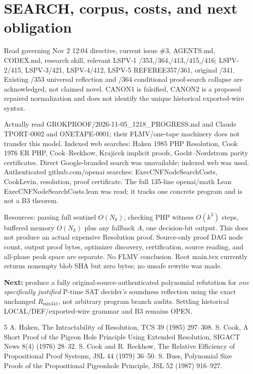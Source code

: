 \documentclass[11pt]{article}
\begin{document}
\section*{SEARCH, corpus, costs, and next obligation}
Read governing Nov 2 12:04 directive, current issue \#3, AGENTS.md, CODEX.md, research skill, relevant LSPV-1 /353,/364,/413,/415,/416; LSPV-2/415, LSPV-3/421, LSPV-4/412, LSPV-5 REFEREE357/361, original /341. Existing /353 universal reflection and /364 conditional proof-search collapse are acknowledged, not claimed novel. CANON1 is falsified, CANON2 is a proposed repaired normalization and does not identify the unique historical exported-wire syntax.

Actually read GROKPROOF/2026-11-05\_1218\_PROGRESS.md and Claude TPORT-0002 and ONETAPE-0001; their FLMV/one-tape machinery does not transfer this model. Indexed web searches: Haken 1985 PHP Resolution, Cook 1976 ER PHP, Cook--Reckhow, Krajicek implicit proofs, Gocht--Nordstrom parity certificates. Direct Google-branded search was unavailable; indexed web was used. Authenticated github.com/openai searches: ExecCNFNodeSearchCosts, CookLevin, resolution, proof certificate. The full 135-line openai/math Lean ExecCNFNodeSearchCosts.lean was read; it tracks one concrete program and is not a B3 theorem.

Resources: parsing full sentinel \(O(N_k)\), checking PHP witness \(O(k^3)\) steps, buffered memory \(O(N_k)\) plus any fallback \(A\), one decision-bit output. This does not produce an actual expensive Resolution proof. Source-only proof DAG node count, output proof bytes, optimizer discovery, certification, source reading, and all-phase peak space are separate. No FLMV conclusion. Root main.tex currently returns nonempty blob SHA but zero bytes; no unsafe rewrite was made.

\textbf{Next:} produce a fully original-source-authenticated polynomial refutation for \emph{one specifically justified} P-time SAT decider's soundness reflection using the exact unchanged \(R_{\mathrm{mix341}}\), not arbitrary program branch audits. Settling historical LOCAL/DEF/exported-wire grammar and B3 remains OPEN.
\begin{thebibliography}{5}
 A. Haken, The Intractability of Resolution, TCS 39 (1985) 297--308.
 S. Cook, A Short Proof of the Pigeon Hole Principle Using Extended Resolution, SIGACT News 8(4) (1976) 28--32.
 S. Cook and R. Reckhow, The Relative Efficiency of Propositional Proof Systems, JSL 44 (1979) 36--50.
 S. Buss, Polynomial Size Proofs of the Propositional Pigeonhole Principle, JSL 52 (1987) 916--927.
\end{thebibliography}
\end{document}
